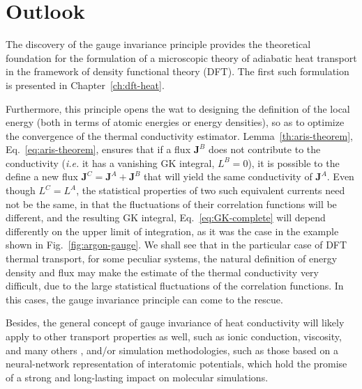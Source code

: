 


\section{Outlook}  \label{sec:gauge-outlook}
The discovery of the gauge invariance principle provides the theoretical foundation for the formulation of a microscopic theory of adiabatic heat transport in the framework of density functional theory (DFT). The first such formulation is presented in Chapter~\ref{ch:dft-heat}. 

Furthermore, this principle opens the wat to designing the definition of the local energy (both in terms of atomic energies or energy densities), so as to optimize the convergence of the thermal conductivity estimator.
Lemma~\ref{th:aris-theorem}, Eq.~\eqref{eq:aris-theorem}, ensures that if a flux $\mathbf{J}^B$ does not contribute to the conductivity (\emph{i.e.} it has a vanishing GK integral, $L^B=0$), it is possible to the define a new flux $\mathbf{J}^C=\mathbf{J}^A+\mathbf{J}^B$ that will yield the same conductivity of $\mathbf{J}^A$. Even though $L^C=L^A$, the statistical properties of two such equivalent currents need not be the same, in that the fluctuations of their correlation functions will be different, and the resulting GK integral, Eq.~\eqref{eq:GK-complete} will depend differently on the upper limit of integration, as it was the case in the example shown in Fig.~\ref{fig:argon-gauge}.
We shall see that in the particular case of DFT thermal transport, for some peculiar systems, the natural definition of energy density and flux may make the estimate of the thermal conductivity very difficult, due to the large statistical fluctuations of the correlation functions. In this cases, the gauge invariance principle can come to the rescue.

Besides, the general concept of gauge invariance of heat conductivity will likely apply to other transport properties as well, such as ionic conduction, viscosity, and many others \cite{Chetty1992}, and/or simulation methodologies, such as those based on a neural-network representation of interatomic potentials, which hold the promise of a strong and long-lasting impact on molecular simulations. 
